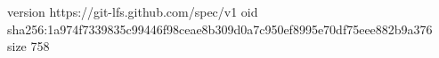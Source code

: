 version https://git-lfs.github.com/spec/v1
oid sha256:1a974f7339835c99446f98ceae8b309d0a7c950ef8995e70df75eee882b9a376
size 758
